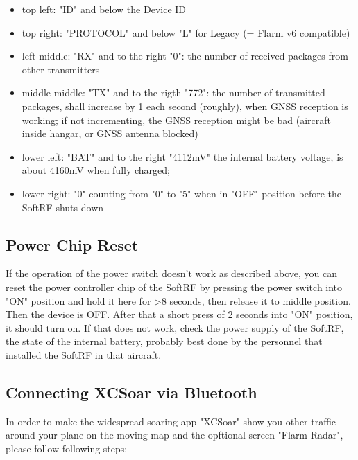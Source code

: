 \documentclass[11pt,a4paper]{article}
\begin{document}
\begin{itemize}
\item top left: "ID" and below the Device ID
\item top right: "PROTOCOL" and below "L" for Legacy (= Flarm v6 compatible)
\item left middle: "RX" and to the right "0": the number of received packages from other transmitters
\item middle middle: "TX" and to the rigth "772": the number of transmitted packages, shall increase by 1 each second (roughly), when GNSS reception is working; if not incrementing, the GNSS reception might be bad (aircraft inside hangar, or GNSS antenna blocked)
\item lower left: "BAT" and to the right "4112mV" the internal battery voltage, is about 4160mV when fully charged;
\item lower right: "0" counting from "0" to "5" when in "OFF" position before the SoftRF shuts down
\end{itemize}

\subsection{Power Chip Reset}\label{power_reset}
If the operation of the power switch doesn't work as described above, you can reset the power controller chip of the SoftRF by pressing the power switch into "ON" position and hold it here for >8 seconds, then release it to middle position. Then the device is OFF. After that a short press of 2 seconds into "ON" position, it should turn on. If that does not work, check the power supply of the SoftRF, the state of the internal battery, probably best done by the personnel that installed the SoftRF in that aircraft.

\subsection{Connecting XCSoar via Bluetooth}
In order to make the widespread soaring app "XCSoar" show you other traffic around your plane on the moving map and the opftional screen "Flarm Radar", please follow following steps:
\end{document}
